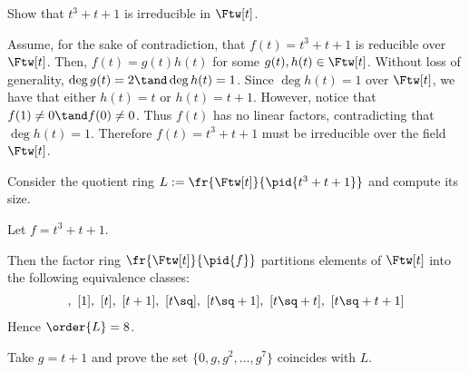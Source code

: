 \documentclass{article}
\begin{document}

\setcounter{section}{3}
\setcounter{exercise}{1}
\begin{subexercise}
Show that $ t^3+t+1 $ is irreducible in $ \Ftw[t] $.
\end{subexercise}

\begin{solution}
Assume, for the sake of contradiction, that $ f(t) = t^3+t+1 $ is reducible over $ \Ftw[t] $.
Then, $ f(t) = g(t)h(t) $ for some $ g(t),h(t)\in \Ftw[t] $.
Without loss of generality, $ \deg g(t) = 2 \tand \deg h(t) = 1 $.
Since $ \deg h(t) = 1 $ over $ \Ftw[t] $, we have that either $ h(t) = t $ or $ h(t) = t+1 $.
However, notice that $ f(1) \neq 0\tand f(0)\neq 0 $.
Thus $ f(t) $ has no linear factors, contradicting that $ \deg h(t) = 1 $.
Therefore $ f(t) = t^3+t+1 $ must be irreducible over the field $ \Ftw[t] $.
\end{solution}

\begin{subexercise}
Consider the quotient ring $ L:= \fr{\Ftw[t]}{\pid{t^3+t+1}} $ and compute its size.
\end{subexercise}

\begin{solution}
Let $ f = t^3+t+1 $.

Then the factor ring $ \fr{\Ftw[t]}{\pid{f}} $ partitions elements of $ \Ftw[t] $ into the following equivalence classes: \begin{align*}
  [0],\ [1],\ [t] ,\ [t+1],\ [t\sq],\ [t\sq+1],\ [t\sq+t],\ [t\sq+t+1]
\end{align*}
Hence $ \order{L} = 8 $.
\end{solution}

\begin{subexercise}
Take $ g=t+1 $ and prove the set $ \{0,g,g^2,\ldots,g^7\} $ coincides with $ L $.
\end{subexercise}
\end{document}
